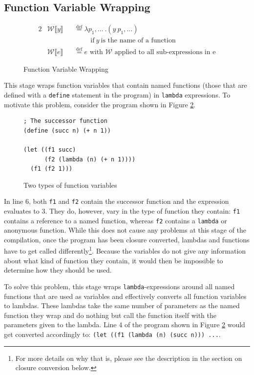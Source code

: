 \documentclass[11pt]{report}
\newcommand{\eqdef}{\stackrel{\text{def}}{=}}%
\begin{document}
\subsection{Function Variable Wrapping}
\begin{figure}[ht]
\begin{alignat*}{2}
&\mathcal{W}\llbracket y \rrbracket && \eqdef \lambda p_1,\dots~.(y~p_1,\dots)\\
&&&\hspace{1cm}\text{if}~y~\text{is the name of a function}\\
&\mathcal{W}\llbracket e \rrbracket && \eqdef e\text{ with $\mathcal{W}$ applied to all sub-expressions in e}
\end{alignat*}
\caption{Function Variable Wrapping}
\label{fvarwrapping}
\end{figure}

This stage wraps function variables that contain named functions (those that are defined with a \texttt{define} statement in the program) in \texttt{lambda} expressions. To motivate this problem, consider the program shown in Figure \ref{wrapexampleprog}.

\begin{figure}[ht]
\begin{lstlisting}
; The successor function
(define (succ n) (+ n 1))

(let ((f1 succ)
      (f2 (lambda (n) (+ n 1))))
  (f1 (f2 1)))
\end{lstlisting}
\caption{Two types of function variables}
\label{wrapexampleprog}
\end{figure}

In line 6, both \texttt{f1} and \texttt{f2} contain the successor function and the expression evaluates to 3. They do, however, vary in the type of function they contain: \texttt{f1} contains a reference to a named function, whereas \texttt{f2} contains a \texttt{lambda} or anonymous function. While this does not cause any problems at this stage of the compilation, once the program has been closure converted, lambdas and functions have to get called differently\footnote{For more details on why that is, please see the description in the section on closure conversion below.}. Because the variables do not give any information about what kind of function they contain, it would then be impossible to determine how they should be used.

To solve this problem, this stage wraps \texttt{lambda}-expressions around all named functions that are used as variables and effectively converts all function variables to lambdas. These lambdas take the same number of parameters as the named function they wrap and do nothing but call the function itself with the parameters given to the lambda. Line 4 of the program shown in Figure \ref{wrapexampleprog} would get converted accordingly to: \texttt{(let ((f1 (lambda (n) (succ n))) ...}.
\end{document}
